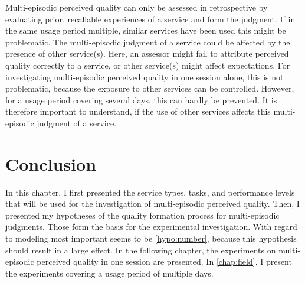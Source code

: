 Multi-episodic perceived quality can only be assessed in retrospective by evaluating prior, recallable experiences of a service and form the judgment.
If in the same usage period multiple, similar services have been used this might be problematic.
The multi-episodic judgment of a service could be affected by the presence of other service(s).
Here, an assessor might fail to attribute perceived quality correctly to a service, or other service(s) might affect expectations.
For investigating multi-episodic perceived quality in one session alone, this is not problematic, because the exposure to other services can be controlled.
However, for a usage period covering several days, this can hardly be prevented.
It is therefore important to understand, if the use of other services affects this multi-episodic judgment of a service.

\section{Conclusion}
In this chapter, I first presented the service types, tasks, and performance levels that will be used for the investigation of multi-episodic perceived quality.
Then, I presented my hypotheses of the quality formation process for multi-episodic judgments.
Those form the basis for the experimental investigation.
With regard to modeling most important seems to be \autoref{hypo:number}, because this hypothesis should result in a large effect.
In the following chapter, the experiments on multi-episodic perceived quality in one session are presented.
In \autoref{chap:field}, I present the experiments covering a usage period of multiple days. 
